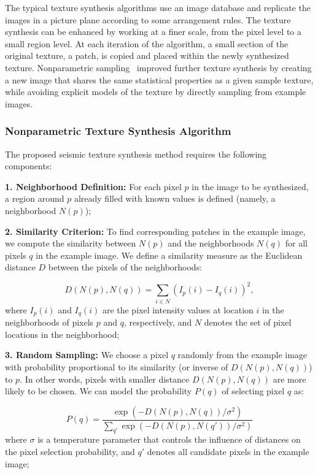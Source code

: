 \documentclass{ieeeaccess}
\providecommand{\DIFaddend}{} %
\DeclareRobustCommand{\DIFaddend}{\DIFOaddend \let\includegraphics\DIFOincludegraphics} %
\begin{document}
\DIFaddend The typical texture synthesis algorithms use an image database and replicate the images in a picture plane according to some arrangement rules. The texture synthesis can be enhanced by working at a finer scale, from the pixel level to a small region level. At each iteration of the algorithm, a small section of the original texture, a patch, is copied and placed within the newly synthesized texture. Nonparametric sampling~\cite{Efros1999} improved further texture synthesis by creating a new image that shares the same statistical properties as a given sample texture, while avoiding explicit models of the texture by directly sampling from example images.

\subsubsection{Nonparametric Texture Synthesis Algorithm}

The proposed seismic texture synthesis method requires the following components:

\textbf{1. Neighborhood Definition:} For each pixel $p$ in the image to be synthesized, a region around $p$ already filled with known values is defined (namely, a neighborhood $N(p)$);

\textbf{2. Similarity Criterion:} To find corresponding patches in the example image, we compute the similarity between $N(p)$ and the neighborhoods $N(q)$ for all pixels $q$ in the example image. We define a similarity measure as the Euclidean distance $D$ between the pixels of the neighborhoods:

\begin{equation}
D(N(p), N(q)) = \sum_{i \in N} \left( I_p(i) - I_q(i) \right)^2,
\end{equation}
where $I_p(i)$ and $I_q(i)$ are the pixel intensity values at location $i$ in the neighborhoods of pixels $p$ and $q$, respectively, and $N$ denotes the set of pixel locations in the neighborhood;

\textbf{3. Random Sampling:} We choose a pixel $q$ randomly from the example image with probability proportional to its similarity (or inverse of $D(N(p), N(q))$) to $p$. In other words, pixels with smaller distance $D(N(p), N(q))$ are more likely to be chosen. We can model the probability $P(q)$ of selecting pixel $q$ as:

\begin{equation}
P(q) = \frac{\exp(-D(N(p), N(q)) / \sigma^2)}{\sum_{q'} \exp(-D(N(p), N(q')) / \sigma^2)}
\end{equation}
where $\sigma$ is a temperature parameter that controls the influence of distances on the pixel selection probability, and $q'$ denotes all candidate pixels in the example image;
\end{document}
